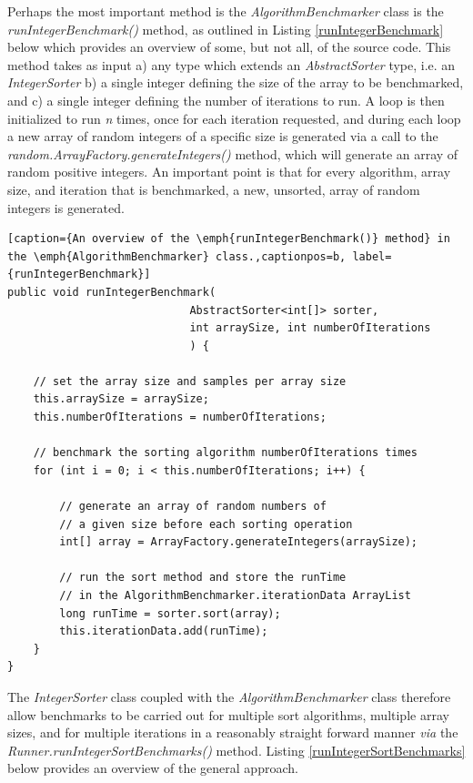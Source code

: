 \documentclass[12pt,a4paper]{article}
\begin{document}
Perhaps the most important method is the \emph{AlgorithmBenchmarker} class is the \emph{runIntegerBenchmark()} method, as outlined in Listing \ref{runIntegerBenchmark} below which provides an overview of some, but not all, of the source code. This method takes as input a) any type which extends an \emph{AbstractSorter} type, i.e. an \emph{IntegerSorter} b) a single integer defining the size of the array to be benchmarked, and c) a single integer defining the number of iterations to run. A loop is then initialized to run \emph{n} times, once for each iteration requested, and during each loop a new array of random integers of a specific size is generated via a call to the \emph{random.ArrayFactory.generateIntegers()} method, which will generate an array of random positive integers. An important point is that for every algorithm, array size, and iteration that is benchmarked, a new, unsorted, array of random integers is generated.

\begin{lstlisting}[caption={An overview of the \emph{runIntegerBenchmark()} method} in the \emph{AlgorithmBenchmarker} class.,captionpos=b, label={runIntegerBenchmark}]
public void runIntegerBenchmark(
							AbstractSorter<int[]> sorter, 
							int arraySize, int numberOfIterations
							) {

	// set the array size and samples per array size
	this.arraySize = arraySize;
	this.numberOfIterations = numberOfIterations;

	// benchmark the sorting algorithm numberOfIterations times
	for (int i = 0; i < this.numberOfIterations; i++) {

		// generate an array of random numbers of
		// a given size before each sorting operation
		int[] array = ArrayFactory.generateIntegers(arraySize);
		
		// run the sort method and store the runTime
		// in the AlgorithmBenchmarker.iterationData ArrayList
		long runTime = sorter.sort(array);
		this.iterationData.add(runTime);
	}	
}
\end{lstlisting}

The \emph{IntegerSorter} class coupled with the \emph{AlgorithmBenchmarker} class therefore allow benchmarks to be carried out for multiple sort algorithms, multiple array sizes, and for multiple iterations in a reasonably straight forward manner \emph{via} the \emph{Runner.runIntegerSortBenchmarks()} method. Listing \ref{runIntegerSortBenchmarks} below provides an overview of the general approach. 

\clearpage
\end{document}
